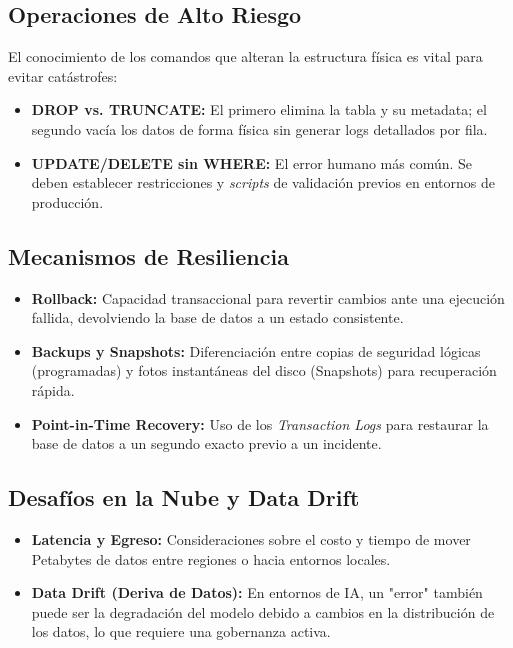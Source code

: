 \documentclass[12pt,a4paper,openany,oneside]{book}
\begin{document}
\subsection{Operaciones de Alto Riesgo}
El conocimiento de los comandos que alteran la estructura física es vital para evitar catástrofes:
\begin{itemize}
    \item \textbf{DROP vs. TRUNCATE:} El primero elimina la tabla y su metadata; el segundo vacía los datos de forma física sin generar logs detallados por fila.
    \item \textbf{UPDATE/DELETE sin WHERE:} El error humano más común. Se deben establecer restricciones y \textit{scripts} de validación previos en entornos de producción.
\end{itemize}

\subsection{Mecanismos de Resiliencia}
\begin{itemize}
    \item \textbf{Rollback:} Capacidad transaccional para revertir cambios ante una ejecución fallida, devolviendo la base de datos a un estado consistente.
    \item \textbf{Backups y Snapshots:} Diferenciación entre copias de seguridad lógicas (programadas) y fotos instantáneas del disco (Snapshots) para recuperación rápida.
    \item \textbf{Point-in-Time Recovery:} Uso de los \textit{Transaction Logs} para restaurar la base de datos a un segundo exacto previo a un incidente.
\end{itemize}



\subsection{Desafíos en la Nube y Data Drift}
\begin{itemize}
    \item \textbf{Latencia y Egreso:} Consideraciones sobre el costo y tiempo de mover Petabytes de datos entre regiones o hacia entornos locales.
    \item \textbf{Data Drift (Deriva de Datos):} En entornos de IA, un "error" también puede ser la degradación del modelo debido a cambios en la distribución de los datos, lo que requiere una gobernanza activa.
\end{itemize}
\end{document}
